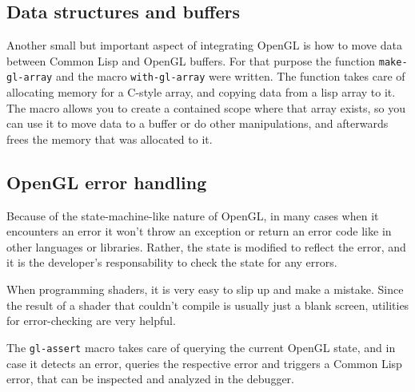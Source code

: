 \subsection{Data structures and buffers}

Another small but important aspect of integrating OpenGL is how to move data between Common Lisp and OpenGL buffers.
For that purpose the function \texttt{make-gl-array} and the macro \texttt{with-gl-array} were written.
The function takes care of allocating memory for a C-style array,
and copying data from a lisp array to it.
The macro allows you to create a contained scope where that array exists,
so you can use it to move data to a buffer or do other manipulations,
and afterwards frees the memory that was allocated to it.

\subsection{OpenGL error handling}

Because of the state-machine-like nature of OpenGL,
in many cases when it encounters an error it won't throw an exception or return an error code like in other languages or libraries.
Rather,
the state is modified to reflect the error,
and it is the developer's responsability to check the state for any errors.

When programming shaders,
it is very easy to slip up and make a mistake.
Since the result of a shader that couldn't compile is usually just a blank screen,
utilities for error-checking are very helpful.

The \texttt{gl-assert} macro takes care of querying the current OpenGL state,
and in case it detects an error,
queries the respective error and triggers a Common Lisp error,
that can be inspected and analyzed in the debugger.
